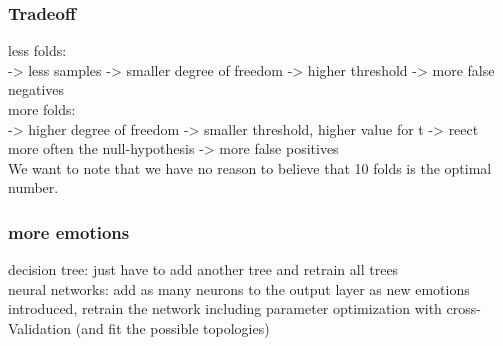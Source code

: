 \documentclass{article}
\begin{document}
\subsubsection{Tradeoff}
less folds:\\
-> less samples -> smaller degree of freedom -> higher threshold -> more false negatives
\\

more folds:\\
-> higher degree of freedom -> smaller threshold, higher value for t -> reect more often the null-hypothesis -> more false positives
\\
We want to note that we have no reason to believe that 10 folds is the optimal number.


\subsubsection{more emotions}
decision tree: just have to add another tree and retrain all trees\\

neural networks: add as many neurons to the output layer as new emotions introduced, retrain the network including parameter optimization with cross-Validation (and fit the possible topologies)
\end{document}

